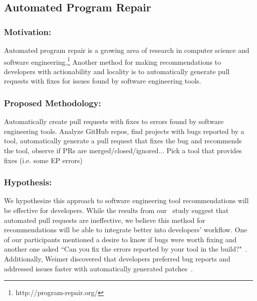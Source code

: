 \subsection{Automated Program Repair}

\subsubsection{Motivation:}

Automated program repair is a growing area of research in computer science and software engineering.\footnote{http://program-repair.org/} Another method for making recommendations to developers with actionability and locality is to automatically generate pull requests with fixes for issues found by software engineering tools.

\subsubsection{Proposed Methodology:}

Automatically create pull requests with fixes to errors found by software engineering tools. Analyze GitHub repos, find projects with bugs reported by a tool, automatically generate a pull request that fixes the bug and recommends the tool, observe if PRs are merged/closed/ignored... Pick a tool that provides fixes (i.e. some EP errors)

\subsubsection{Hypothesis:}

We hypothesize this approach to software engineering tool recommendations will be effective for developers. While the results from our \tele~study suggest that automated pull requests are ineffective, we believe this method for recommendations will be able to integrate better into developers' workflow. One of our participants mentioned a desire to know if bugs were worth fixing and another one asked ``Can you fix
the errors reported by your tool in the build?"~\cite{SorryToBotherYou}. Additionally, Weimer discovered that developers preferred bug reports and addressed issues faster with automatically generated patches~\cite{WeimerPatch}.
